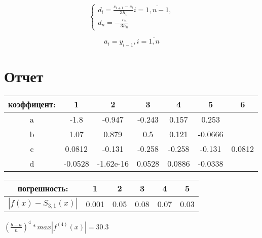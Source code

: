 \documentclass{article}
\begin{document}
\begin{equation}
\begin{cases}
    d_i = \frac{c_{i+1}-c_i}{3h_i} i=\overline{1, n-1}, \\
    d_n = -\frac{c_n}{3h_n}
\end{cases}
\end{equation}

\begin{equation}
    a_i = y_{i-1}, i=\overline{1, n}
\end{equation}

\section{Отчет}

\label{tabular:timesandtenses}
\begin{center}
\begin{tabular}{|c|c|c|c|c|c|c|} \hline
коэффицент: & 1 & 2 & 3 & 4 & 5 & 6 \\ \hline
a & -1.8 & -0.947 & -0.243 & 0.157 & 0.253 & \\
b & 1.07 & 0.879 & 0.5 & 0.121 & -0.0666 & \\
c & 0.0812 & -0.131 & -0.258 & -0.258 & -0.131 & 0.0812 \\
d & -0.0528 & -1.62e-16 & 0.0528 & 0.0886 & -0.0338 & \\ \hline
\end{tabular}
\end{center}

\label{tabular:timesandtenses}
\begin{center}
\begin{tabular}{|c|c|c|c|c|c|} \hline
погрешность: & 1 & 2 & 3 & 4 & 5 \\ \hline
$|f(x)-S_{3,1}(x)|$ & 0.001 & 0.05 & 0.08 & 0.07 & 0.03 \\ \hline
\end{tabular}
\end{center}

\begin{center}
$(\frac{b-a}{n})^4*max|f^{(4)}(x)| = 30.3$
\end{center}
\end{document}
